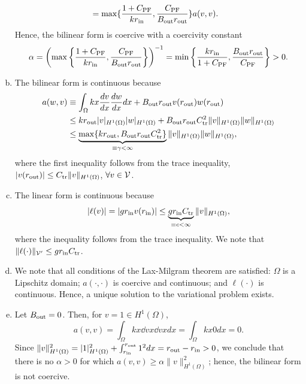 \documentclass[preprint,11pt]{article}
\begin{document}
\begin{enumerate}[(a)]
\begin{align*}
 &=
         \max\{  \frac{1 + C_{\rm PF}}{k r_{\rm in}}, \frac{C_{\rm PF} }{B_{\rm out} r_{\rm out}} \} a(v,v).
  \end{align*}
  Hence, the bilinear form is coercive with a coercivity constant
  \begin{equation*}
    \alpha = \left( \max\left\{ \frac{1 + C_{\rm PF}}{k r_{\rm in}}, \frac{ C_{\rm PF}}{B_{\rm out} r_{\rm out}} \right\} \right)^{-1}
    = \min\left\{ \frac{k r_{\rm in}}{1 + C_{\rm PF}}, \frac{B_{\rm out} r_{\rm out}}{C_{\rm PF}} \right\} > 0.
  \end{equation*}
\item The bilinear form is continuous because
  \begin{align*}
    a(w,v) &\equiv \int_{\Omega} kx \frac{d v}{d x} \frac{d w}{d x} dx + B_{\rm out} r_{\rm out} v(r_{\rm out}) w(r_{\rm out})
    \\
    &\leq
    k r_{\rm out} | v |_{H^1(\Omega)} | w |_{H^1(\Omega)} + B_{\rm out} r_{\rm out} C_{\rm tr}^2 \| v \|_{H^1(\Omega)} \| w \|_{H^1(\Omega)}
    \\
    &\leq
    \underbrace{ \max\{ k r_{\rm out}, B_{\rm out} r_{\rm out} C_{\rm tr}^2 \} }_{\equiv \gamma < \infty}  \| v \|_{H^1(\Omega)}\| w \|_{H^1(\Omega)},
  \end{align*}
  where the first inequality follows from the trace inequality, $|v(r_{\rm out})| \leq C_{\rm tr}\|v\|_{H^1(\Omega)}$, $\forall v \in \mathcal{V}$.
\item The linear form is continuous because
  \begin{equation*}
    | \ell(v) | = |gr_{\rm in} v(r_{\rm in})| \leq \underbrace{ gr_{\rm in} C_{\rm tr} }_{\equiv c < \infty} \|v\|_{H^1(\Omega)}, 
  \end{equation*}
  where the inequality follows from the trace inequality.  We note that $\| \ell(\cdot) \|_{\mathcal{V}'} \leq  gr_{\rm in} C_{\rm tr}$.
\item We note that all conditions of the Lax-Milgram theorem are satisfied: $\Omega$ is a Lipschitz domain; $a(\cdot,\cdot)$ is coercive and continuous; and $\ell(\cdot)$ is continuous.  Hence, a unique solution to the variational problem exists.
\item Let $B_{\rm out} = 0$.  Then, for $v = 1 \in H^1(\Omega)$,
  \begin{equation*}
    a(v,v) = \int_{\Omega} k x \dd{v}{x} \dd{v}{x} dx = \int_{\Omega} k x 0 dx = 0.
  \end{equation*}
  Since $\| v \|_{H^1(\Omega)}^2 = | 1 |_{H^1(\Omega)}^2 + \int_{r_{\rm in}}^{r_{\rm out}} 1^2 dx = r_{\rm out} - r_{\rm in} > 0 $, we conclude that there is no $\alpha > 0$ for which $a(v,v) \geq \alpha \| v \|_{H^1(\Omega)}^2$; hence, the bilinear form is not coercive.


\end{enumerate}
\end{document}
